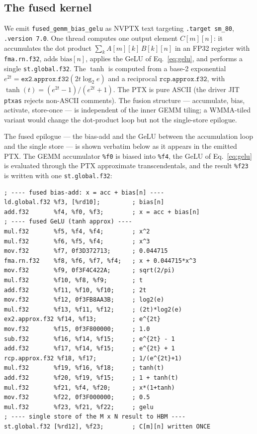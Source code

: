 \documentclass[11pt,a4paper]{article}
\begin{document}
\subsection{The fused kernel}

We emit \texttt{fused\_gemm\_bias\_gelu} as NVPTX text targeting
\texttt{.target sm\_80}, \texttt{.version 7.0}. One thread computes one output
element $C[m][n]$: it accumulates the dot product
$\sum_k A[m][k]\,B[k][n]$ in an FP32 register with \texttt{fma.rn.f32}, adds
$\mathrm{bias}[n]$, applies the GeLU of Eq.~\eqref{eq:gelu}, and performs a
single \texttt{st.global.f32}. The $\tanh$ is computed from a base-2 exponential
$e^{2t} = \texttt{ex2.approx.f32}(2t\log_2 e)$ and a reciprocal
$\texttt{rcp.approx.f32}$, with $\tanh(t) = (e^{2t}-1)/(e^{2t}+1)$. The PTX is
pure ASCII (the driver JIT \texttt{ptxas} rejects non-ASCII comments). The
fusion structure --- accumulate, bias, activate, store-once --- is independent
of the inner GEMM tiling; a WMMA-tiled variant would change the dot-product
loop but not the single-store epilogue.

The fused epilogue --- the bias-add and the GeLU between the accumulation loop
and the single store --- is shown verbatim below as it appears in the emitted
PTX. The GEMM accumulator \texttt{\%f0} is biased into \texttt{\%f4}, the GeLU
of Eq.~\eqref{eq:gelu} is evaluated through the PTX approximate
transcendentals, and the result \texttt{\%f23} is written with one
\texttt{st.global.f32}:

\begin{lstlisting}
; ---- fused bias-add: x = acc + bias[n] ----
ld.global.f32 %f3, [%rd10];         ; bias[n]
add.f32       %f4, %f0, %f3;        ; x = acc + bias[n]
; ---- fused GeLU (tanh approx) ----
mul.f32       %f5, %f4, %f4;        ; x^2
mul.f32       %f6, %f5, %f4;        ; x^3
mov.f32       %f7, 0f3D372713;      ; 0.044715
fma.rn.f32    %f8, %f6, %f7, %f4;   ; x + 0.044715*x^3
mov.f32       %f9, 0f3F4C422A;      ; sqrt(2/pi)
mul.f32       %f10, %f8, %f9;       ; t
add.f32       %f11, %f10, %f10;     ; 2t
mov.f32       %f12, 0f3FB8AA3B;     ; log2(e)
mul.f32       %f13, %f11, %f12;     ; (2t)*log2(e)
ex2.approx.f32 %f14, %f13;          ; e^{2t}
mov.f32       %f15, 0f3F800000;     ; 1.0
sub.f32       %f16, %f14, %f15;     ; e^{2t} - 1
add.f32       %f17, %f14, %f15;     ; e^{2t} + 1
rcp.approx.f32 %f18, %f17;          ; 1/(e^{2t}+1)
mul.f32       %f19, %f16, %f18;     ; tanh(t)
add.f32       %f20, %f19, %f15;     ; 1 + tanh(t)
mul.f32       %f21, %f4, %f20;      ; x*(1+tanh)
mov.f32       %f22, 0f3F000000;     ; 0.5
mul.f32       %f23, %f21, %f22;     ; gelu
; ---- single store of the M x N result to HBM ----
st.global.f32 [%rd12], %f23;        ; C[m][n] written ONCE
\end{lstlisting}
\end{document}
